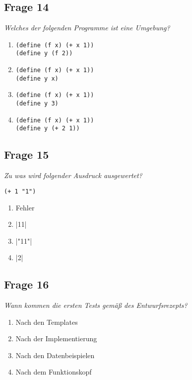 \documentclass[a4paper, 11pt]{article}
\begin{document}
\subsection*{Frage 14}
\textit{Welches der folgenden Programme ist eine Umgebung?}
\begin{enumerate}[label=$\square$]
	\item \begin{verbatim}
(define (f x) (+ x 1))
(define y (f 2))
\end{verbatim}
	\item \begin{verbatim}
(define (f x) (+ x 1))
(define y x)
\end{verbatim}
	\item \begin{verbatim}
(define (f x) (+ x 1))
(define y 3)
\end{verbatim}
	\item \begin{verbatim}
(define (f x) (+ x 1))
(define y (+ 2 1))
\end{verbatim}
\end{enumerate}

\subsection*{Frage 15}
\textit{Zu was wird folgender Ausdruck ausgewertet?}
\begin{verbatim}
(+ 1 "1")
\end{verbatim}
\begin{enumerate}[label=$\square$]
	\item Fehler
	\item {}|11|
	\item {}|"11"|
	\item {}|2|
\end{enumerate}

\subsection*{Frage 16}
\textit{Wann kommen die ersten Tests gemäß des Entwurfsrezepts?}
\begin{enumerate}[label=$\square$]
	\item Nach den Templates
	\item Nach der Implementierung
	\item Nach den Datenbeispielen
	\item Nach dem Funktionskopf
\end{enumerate}
\end{document}
